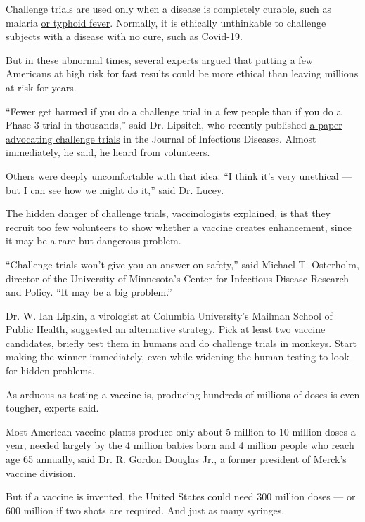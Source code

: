 Challenge trials are used only when a disease is completely curable,
such as malaria
\href{https://www.nytimes.com/2017/09/28/health/typhoid-vaccine-trial.html}{or
typhoid fever}. Normally, it is ethically unthinkable to challenge
subjects with a disease with no cure, such as Covid-19.

But in these abnormal times, several experts argued that putting a few
Americans at high risk for fast results could be more ethical than
leaving millions at risk for years.

``Fewer get harmed if you do a challenge trial in a few people than if
you do a Phase 3 trial in thousands,'' said Dr. Lipsitch, who recently
published
\href{https://academic.oup.com/jid/advance-article/doi/10.1093/infdis/jiaa152/5814216}{a
paper advocating challenge trials} in the Journal of Infectious
Diseases. Almost immediately, he said, he heard from volunteers.

Others were deeply uncomfortable with that idea. ``I think it's very
unethical --- but I can see how we might do it,'' said Dr. Lucey.

The hidden danger of challenge trials, vaccinologists explained, is that
they recruit too few volunteers to show whether a vaccine creates
enhancement, since it may be a rare but dangerous problem.

``Challenge trials won't give you an answer on safety,'' said Michael T.
Osterholm, director of the University of Minnesota's Center for
Infectious Disease Research and Policy. ``It may be a big problem.''

Dr. W. Ian Lipkin, a virologist at Columbia University's Mailman School
of Public Health, suggested an alternative strategy. Pick at least two
vaccine candidates, briefly test them in humans and do challenge trials
in monkeys. Start making the winner immediately, even while widening the
human testing to look for hidden problems.

As arduous as testing a vaccine is, producing hundreds of millions of
doses is even tougher, experts said.

Most American vaccine plants produce only about 5 million to 10 million
doses a year, needed largely by the 4 million babies born and 4 million
people who reach age 65 annually, said Dr. R. Gordon Douglas Jr., a
former president of Merck's vaccine division.

But if a vaccine is invented, the United States could need 300 million
doses --- or 600 million if two shots are required. And just as many
syringes.

